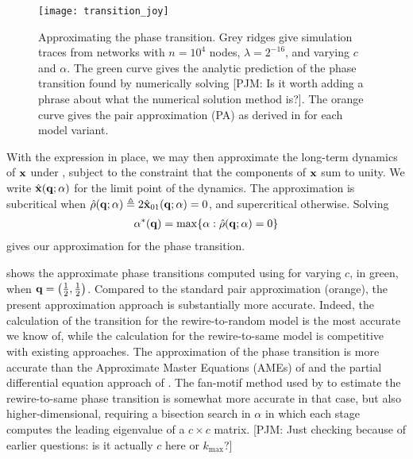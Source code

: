 \documentclass[review, onefignum, onetabnum]{siamart171218}
\newcommand{\pjm}[1]{{\color{blue}[PJM: #1]}}
\begin{document}
		
		
		\begin{figure}
			\centering
				\texttt{[image: transition\_joy]}
			\caption{Approximating the phase transition. 
			Grey ridges give simulation traces from networks with $n = 10^4$ nodes, $\lambda = 2^{-16}$, and varying $c$ and $\alpha$. 
			The green curve gives the analytic prediction of the phase transition found by numerically solving  \pjm{Is it worth adding a phrase about what the numerical solution method is?}. The orange curve gives the pair approximation (PA) as derived in \cite{Durrett2012} for each model variant.}
			\label{fig:transition_joy}
		\end{figure}

		With the expression  in place, we may then approximate the long-term dynamics of $\mathbf{x}$ under , subject to the constraint that the components of $\mathbf{x}$ sum to unity. 
		We write $\hat{\mathbf{x}}(\mathbf{q}; \alpha)$ for the limit point of the dynamics. 
		The approximation is subcritical when $\hat{\rho}(\mathbf{q}; \alpha) \triangleq 2\hat{\mathbf{x}}_{01}(\mathbf{q}; \alpha) = 0$, and supercritical otherwise. 
		Solving 
		\begin{align}
			\alpha^*(\q) = \max \{\alpha : \hat{\rho}(\q; \alpha) = 0\} \label{eq:transition_approx}
		\end{align}
		gives our approximation for the phase transition. 

		 shows the approximate phase transitions computed using  for varying $c$, in green, when $\mathbf{q} = \left(\frac{1}{2}, \frac{1}{2}\right)$. %
		Compared to the standard pair approximation (orange), the present approximation approach is substantially more accurate.
		Indeed, the calculation of the transition for the rewire-to-random model is the most accurate we know of, while the calculation for the rewire-to-same model is competitive with existing approaches.
		The approximation of the phase transition is more accurate than the Approximate Master Equations (AMEs) of \cite{Durrett2012} and the partial differential equation approach of \cite{Silk2014}. 
		The fan-motif method used by \cite{Bohme2011} to estimate the rewire-to-same phase transition is somewhat more accurate in that case, but also higher-dimensional, requiring a bisection search in $\alpha$ in which each stage computes the leading eigenvalue of a $c\times c$ matrix. \pjm{Just checking because of earlier questions: is it actually $c$ here or $k_\mathrm{max}$?} 
\end{document}
